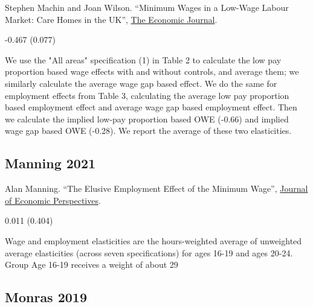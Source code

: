 \noindent Stephen Machin and Joan Wilson. ``Minimum Wages in a Low-Wage Labour Market: Care Homes in the UK'', \href{https://doi.org/10.1111/j.0013-0133.2003.00199.x}{The Economic Journal}.

\vspace{0.7em}

 -0.467 (0.077)

\vspace{0.7em}

 We use the "All areas" specification (1) in Table 2 to calculate the low pay proportion based wage effects with and without controls, and average them; we similarly calculate the average wage gap based effect. We do the same for employment effects from Table 3, calculating the average low pay proportion based employment effect and average wage gap based employment effect. Then we calculate the implied low-pay proportion based OWE (-0.66) and implied wage gap based OWE (-0.28). We report the average of these two elasticities.

\subsection*{Manning 2021}
\vspace{-0.7em}

\noindent Alan Manning. ``The Elusive Employment Effect of the Minimum Wage'', \href{https://doi.org/10.1257/jep.35.1.3}{Journal of Economic Perspectives}.

\vspace{0.7em}

 0.011 (0.404)

\vspace{0.7em}

 Wage and employment elasticities are the hours-weighted average of unweighted average elasticities (across seven specifications) for ages 16-19 and ages 20-24. Group Age 16-19 receives a weight of about 29%

\subsection*{Monras 2019}
\vspace{-0.7em}


